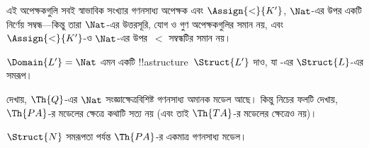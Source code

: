 \documentclass[../../../include/open-logic-section]{subfiles}
\begin{document}
\begin{ex}
এই অপেক্ষকগুলি সবই স্বাভাবিক সংখ্যার গণনসাধ্য অপেক্ষক এবং
$\Assign{<}{K'}$, $\Nat$-এর উপর একটি নির্ণেয় সম্বন্ধ---কিন্তু তারা
$\Nat$-এর উত্তরসূরি, যোগ ও গুণ অপেক্ষকগুলির সমান নয়, এবং
$\Assign{<}{K'}$-ও $\Nat$-এর উপর~$<$ সম্বন্ধটির সমান নয়।
\end{ex}

\begin{prob}
$\Domain{L'}=\Nat$ এমন একটি !!a{structure}~$\Struct{L'}$ দাও, যা
-এর $\Struct{L}$-এর সমরূপ।
\end{prob}

\begin{explain}
 দেখায়, $\Th{Q}$-এর $\Nat$ সংজ্ঞাক্ষেত্রবিশিষ্ট
গণনসাধ্য অমানক মডেল আছে। কিন্তু নিচের ফলটি দেখায়, $\Th{PA}$-র মডেলের
ক্ষেত্রে কথাটি সত্য নয় (এবং তাই $\Th{TA}$-র মডেলের ক্ষেত্রেও নয়)।
\end{explain}

\begin{thm}[টেনেনবাউমের উপপাদ্য]
$\Struct{N}$ সমরূপতা পর্যন্ত $\Th{PA}$-র একমাত্র গণনসাধ্য মডেল।
\end{thm}
  
\end{document}
